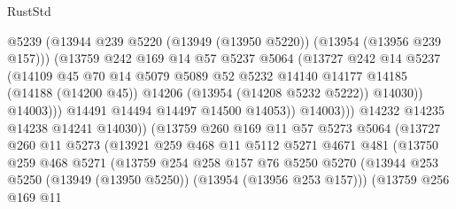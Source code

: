 \begin{lexlean}{RustStd}
\begin{coremodule}
                              @5239
                              (@13944
                                @239
                                @5220
                                (@13949 (@13950 @5220))
                                (@13954 (@13956 @239 @157)))
                              (@13759
                                @242
                                @169
                                @14
                                @57
                                @5237
                                @5064
                                (@13727
                                  @242
                                  @14
                                  @5237
                                  (@14109
                                    @45
                                    @70
                                    @14
                                    @5079
                                    @5089
                                    @52
                                    @5232
                                    @14140
                                    @14177
                                    @14185
                                    (@14188 (@14200 @45))
                                    @14206
                                    (@13954 (@14208 @5232 @5222))
                                    @14030))
                                @14003)))
                          @14491
                          @14494
                          @14497
                          @14500
                          @14053))
                      @14003)))
                @14232
                @14235
                @14238
                @14241
                @14030))
            (@13759
              @260
              @169
              @11
              @57
              @5273
              @5064
              (@13727
                @260
                @11
                @5273
                (@13921
                  @259
                  @468
                  @11
                  @5112
                  @5271
                  @4671
                  @481
                  (@13750
                    @259
                    @468
                    @5271
                    (@13759
                      @254
                      @258
                      @157
                      @76
                      @5250
                      @5270
                      (@13944 @253 @5250 (@13949 (@13950 @5250)) (@13954 (@13956 @253 @157)))
                      (@13759
                        @256
                        @169
                        @11

\end{coremodule}
\end{lexlean}
